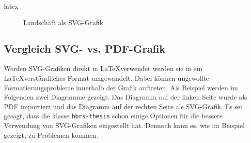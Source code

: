 \begin{showcase}
    \begin{code}{latex}
        \begin{figure}
            \centering
            
            \caption{Landschaft als SVG-Grafik}
            \label{fig:landschaft-als-svg-grafik}
        \end{figure}
    \end{code}
    \tcblower
    \begin{center}
        
        \label{fig:landschaft-als-svg-grafik}
    \end{center}
\end{showcase}

\subsection{Vergleich SVG- vs. PDF-Grafik}
\label{subsec:vergleich-svg-vs-pdf-grafik}
Werden SVG-Grafiken direkt in \LaTeX verwendet werden sie in ein \LaTeX verständliches Format umgewandelt. Dabei können ungewollte Formatierungsprobleme innerhalb der Grafik auftreten. Als Beispiel werden im Folgenden zwei Diagramme gezeigt. Das Diagramm auf der linken Seite wurde als PDF importiert und das Diagramm auf der rechten Seite als SVG-Grafik. Es sei gesagt, dass die klasse \texttt{hbrs-thesis} schon einige Optionen für die bessere Verwendung von SVG-Grafiken eingestellt hat. Dennoch kann es, wie im Beispiel gezeigt, zu Problemen kommen.

